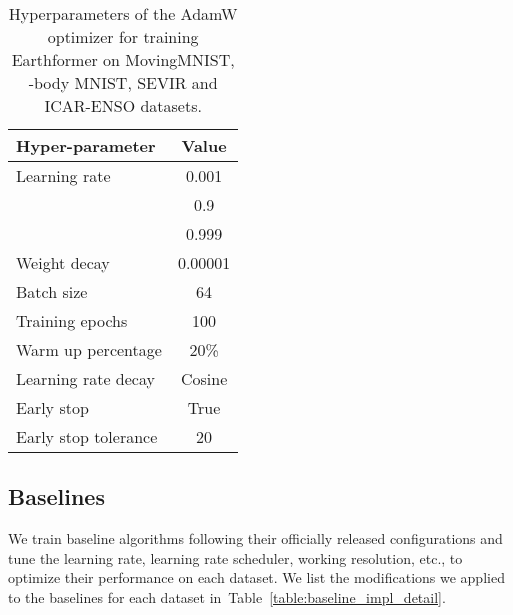 \documentclass{article}
\newcommand{\tabref}[1]{Table~\ref{#1}}
\def\nbody{-body MNIST}
\begin{document}
\begin{table}[!tb]
    \centering
    \caption{Hyperparameters of the AdamW optimizer for training Earthformer on MovingMNIST, \nbody{}, SEVIR and ICAR-ENSO datasets.}
    \begin{tabular}{l|c}
    	\toprule[1.5pt]
    	Hyper-parameter & Value \\
    	\midrule\midrule
        Learning rate               & 0.001     \\
                           & 0.9       \\
                           & 0.999     \\
        Weight decay                & 0.00001   \\
        Batch size                  & 64        \\
        Training epochs             & 100       \\
        Warm up percentage          & 20\%      \\
        Learning rate decay         & Cosine    \\
        Early stop                  & True      \\
        Early stop tolerance        & 20        \\
        \bottomrule[1.5pt]
    \end{tabular}
    \label{table:earthformer_optimization}
\end{table}

\subsection{Baselines}
We train baseline algorithms following their officially released configurations and tune the learning rate, learning rate scheduler, working resolution, etc., to optimize their performance on each dataset. We list the modifications we applied to the baselines for each dataset in~\tabref{table:baseline_impl_detail}.
\end{document}
